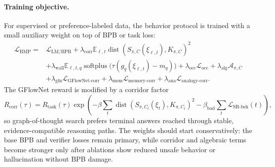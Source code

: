 \documentclass[11pt]{article}
\theoremstyle{definition}
\theoremstyle{plain}
\theoremstyle{remark}
\numberwithin{equation}{section}
\newcommand{\Eop}{\mathbb{E}}
\begin{document}
\paragraph{Training objective.}
For supervised or preference-labeled data, the behavior protocol is trained with a small auxiliary weight on top of BPB or task loss:
\begin{equation}
\begin{aligned}
  \mathcal L_{\mathrm{BMP}}
  ={}&
  \mathcal L_{\mathrm{LM/BPB}}
  +\lambda_{\mathrm{corr}}\Eop_{\ell,t}
     \operatorname{dist}(S_{\pi,C}(\xi_{\ell,t}),K_{\pi,C})^2\\
  &+\lambda_{\mathrm{wall}}\Eop_{\ell,t,q}
     \operatorname{softplus}\bigl(\tau(g_q(\xi_{\ell,t})-m_q)\bigr)
  +\lambda_{\mathrm{occ}}\mathcal L_{\mathrm{occ}}
  +\lambda_{\mathrm{alg}}\mathcal A_{\pi,C}\\
  &+\lambda_{\mathrm{gfn}}\mathcal L_{\mathrm{GFlowNet\text{-}corr}}
  +\lambda_{\mathrm{mem}}\mathcal L_{\mathrm{memory\text{-}corr}}
  +\lambda_{\mathrm{ana}}\mathcal L_{\mathrm{analogy\text{-}corr}} .
\end{aligned}
\end{equation}
The GFlowNet reward is modified by a corridor factor
\begin{equation}
  R_{\mathrm{corr}}(\tau)
  =
  R_{\mathrm{task}}(\tau)
  \exp\left(-\beta\sum_t
  \operatorname{dist}(S_{\pi,C_t}(\xi_t),K_{\pi,C_t})^2
  -\beta_{\mathrm{bad}}\sum_t \mathcal L_{\mathrm{SR\text{-}beh}}(t)\right),
\end{equation}
so graph-of-thought search prefers terminal answers reached through stable, evidence-compatible reasoning paths.  The weights should start conservatively: the base BPB and verifier losses remain primary, while corridor and algebraic terms become stronger only after ablations show reduced unsafe behavior or hallucination without BPB damage.
\end{document}
